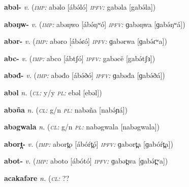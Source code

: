 \newentry
\headword\textbf{abəl-}
\ipa{[ábə́l-]}
\synpos\textit{v.} 
\imperative(\textit {\textsc{imp:}} abəlo [ábə́ló] 
\imperfective\textit{\textsc{ipfv:}} gabəla [gabə́la])

\newentry
\headword\textbf{abəŋw-}
\ipa{[ábə́ŋʷ-]}
\synpos\textit{v.} 
\imperative(\textit {\textsc{imp:}} abəŋwo [ábə́ŋʷó] 
\imperfective\textit{\textsc{ipfv:}} ɡabəŋwa [ɡabə́ŋʷá])

\newentry
\headword\textbf{abər-}
\ipa{[ábə́ɾ-]}
\synpos\textit{v.} 
\imperative(\textit {\textsc{imp:}} abəro [ábə́ɾó] 
\imperfective\textit{\textsc{ipfv:}} ɡabərwa [ɡabə́ɾʷa])

\newentry
\headword\textbf{abc-}
\ipa{[ábtʃ-]}
\synpos\textit{v.} 
\imperative(\textit {\textsc{imp:}} abco [ábtʃó] 
\imperfective\textit{\textsc{ipfv:}} gabəcë [gabə́tʃɜ])

\newentry
\headword\textbf{abəđ-}
\ipa{[ábə́ð-]}
\synpos\textit{v.} 
\imperative(\textit {\textsc{imp:}} abəđo [ábə́ðó] 
\imperfective\textit{\textsc{ipfv:}} ɡabəđa [ɡabə́ðá])

\newentry
\headword\textbf{abəl}
\ipa{[abəl]}
\synpos\textit{n.} 
\class(\textit{\textsc{cl:}} {y/y}
\plural\textit{\textsc{pl:}} ebəl [ebəl])

\newentry
\headword\textbf{abəña}
\ipa{[abə́ɲá]}
\synpos\textit{n.} 
\class(\textit{\textsc{cl:}} {g/n}
\plural\textit{\textsc{pl:}} nabəña [nabə́ɲá])

\newentry
\headword\textbf{abəgwala}
\ipa{[abəgwala]}
\synpos\textit{n.} 
\class(\textit{\textsc{cl:}} {g/n}
\plural\textit{\textsc{pl:}} nabəgwala [nabəgwala])

\newentry
\headword\textbf{abort̪-}
\ipa{[ábóŕt̪-]}
\synpos\textit{v.} 
\imperative(\textit {\textsc{imp:}} abort̪o [ábóŕt̪ó] 
\imperfective\textit{\textsc{ipfv:}} ɡabort̪a [ɡabóŕt̪a])

\newentry
\headword\textbf{abot-}
\ipa{[ábót-]}
\synpos\textit{v.} 
\imperative(\textit {\textsc{imp:}} aboto [ábótó] 
\imperfective\textit{\textsc{ipfv:}} ɡabət̪wa [ɡabə́t̪ʷa])


\newentry
\headword\textbf{acakafəre}
\ipa{[aʧakafəre]}
\synpos\textit{n.} 
\class(\textit{\textsc{cl:}} {??} %

